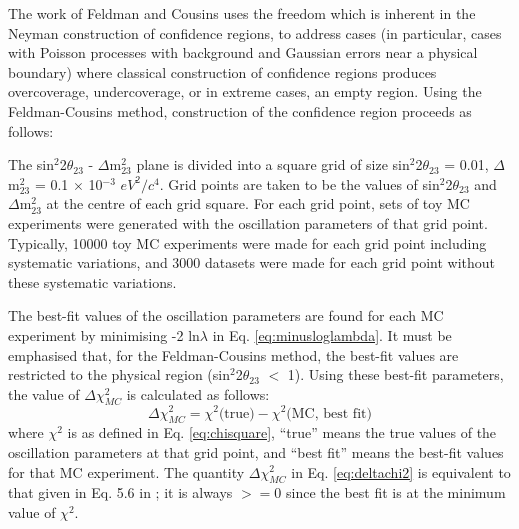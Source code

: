 The work of Feldman and Cousins \cite{FeldmanCousins} 
uses the freedom which is inherent in the Neyman construction of confidence regions, 
to address cases 
(in particular, cases with
Poisson processes with background and Gaussian errors near a physical boundary)
where classical construction of confidence regions produces overcoverage, undercoverage, or
in extreme cases, an empty region.
Using the Feldman-Cousins method, construction of the confidence region proceeds as follows:

The sin$^{2}$2$\theta_{23}$ - $\Delta$m$^{2}_{23}$ plane is divided into a square grid of size 
sin$^{2}$2$\theta_{23}$ = 0.01, $\Delta$m$^{2}_{23}$ = 0.1 $\times$ 10$^{-3}$ $eV^{2}/c^{4}$. 
Grid points are taken to be the values of sin$^{2}$2$\theta_{23}$ and $\Delta$m$^{2}_{23}$ 
at the centre of each grid square. 
For each grid point, sets of toy MC experiments were generated
with the oscillation parameters of that grid point. 
Typically, 10000 toy MC experiments were made for each grid point including systematic variations, 
and 3000 datasets were made for each grid point without these systematic variations.

The best-fit values of the oscillation parameters are found for each MC experiment 
by minimising -2 ln$\lambda$ in Eq. \ref{eq:minusloglambda}.
It must be emphasised that, for the Feldman-Cousins method, 
the best-fit values are restricted to the physical region (sin$^{2}$2$\theta_{23}$ $<$ 1). 
Using these best-fit parameters, the value of $\Delta\chi^{2}_{MC}$ is calculated as follows:
\begin{equation}
\displaystyle
\Delta \chi^{2}_{MC} = \chi^{2} \textrm{(true)} - \chi^{2} \textrm{(MC, best fit)}
\label{eq:deltachi2}
\end{equation}
where $\chi^{2}$ is as defined in Eq. \ref{eq:chisquare}, 
``true'' means the true values of the oscillation parameters at that grid point, and 
``best fit'' means the best-fit values for that MC experiment. 
The quantity $\Delta \chi^{2}_{MC}$ in Eq. \ref{eq:deltachi2} is equivalent 
to that given in Eq. 5.6 in \cite{FeldmanCousins}; 
it is always $>=$0 since the best fit is at the minimum value of $\chi^{2}$. 

